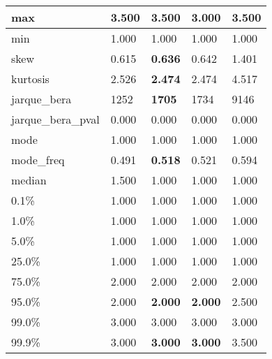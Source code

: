 \begin{table}[H]
\begin{tabular}{|l|m{10em}|m{10em}|m{10em}|m{10em}|}
\hline max & 3.500 & \bfseries 3.500 & \cellcolor[rgb]{0.9, 0.54, 0.52} 3.000 & \bfseries 3.500 \\
\hline min & 1.000 & 1.000 & 1.000 & 1.000 \\
\hline skew & 0.615 & \bfseries 0.636 & 0.642 & \cellcolor[rgb]{0.9, 0.54, 0.52} 1.401 \\
\hline kurtosis & 2.526 & \bfseries 2.474 & 2.474 & \cellcolor[rgb]{0.9, 0.54, 0.52} 4.517 \\
\hline jarque\_bera & 1252 & \bfseries 1705 & 1734 & \cellcolor[rgb]{0.9, 0.54, 0.52} 9146 \\
\hline jarque\_bera\_pval & 0.000 & 0.000 & 0.000 & 0.000 \\
\hline mode & 1.000 & 1.000 & 1.000 & 1.000 \\
\hline mode\_freq & 0.491 & \bfseries 0.518 & 0.521 & \cellcolor[rgb]{0.9, 0.54, 0.52} 0.594 \\
\hline median & 1.500 & 1.000 & 1.000 & 1.000 \\
\hline 0.1\% & 1.000 & 1.000 & 1.000 & 1.000 \\
\hline 1.0\% & 1.000 & 1.000 & 1.000 & 1.000 \\
\hline 5.0\% & 1.000 & 1.000 & 1.000 & 1.000 \\
\hline 25.0\% & 1.000 & 1.000 & 1.000 & 1.000 \\
\hline 75.0\% & 2.000 & 2.000 & 2.000 & 2.000 \\
\hline 95.0\% & 2.000 & \bfseries 2.000 & \bfseries 2.000 & \cellcolor[rgb]{0.9, 0.54, 0.52} 2.500 \\
\hline 99.0\% & 3.000 & 3.000 & 3.000 & 3.000 \\
\hline 99.9\% & 3.000 & \bfseries 3.000 & \bfseries 3.000 & \cellcolor[rgb]{0.9, 0.54, 0.52} 3.500 \\
\hline
\end{tabular}
\end{table}
